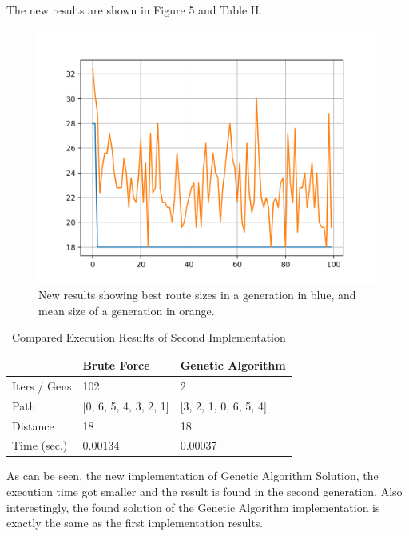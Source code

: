 \documentclass[journal,transmag]{IEEEtran}
\begin{document}
    The new results are shown in Figure 5 and Table II.

    \begin{figure}[H]
        \includegraphics[width=\linewidth]{new-results.png}
        \caption{
            New results showing best route sizes in a generation in blue, and
            mean size of a generation in orange.
        }
        \label{fig:new-results}
    \end{figure}

    \begin{table}[H]
        \begin{center}
            \begin{tabular}{| l | l | l |}
            \hline
            & Brute Force & Genetic Algorithm \\ \hline
            Iters / Gens & 102 & 2 \\ \hline
            Path & [0, 6, 5, 4, 3, 2, 1] & [3, 2, 1, 0, 6, 5, 4] \\ \hline
            Distance & 18 & 18 \\ \hline
            Time (sec.) & 0.00134 & 0.00037 \\
            \hline
            \end{tabular}
        \end{center}
        \caption{Compared Execution Results of Second Implementation}
    \end{table}

    As can be seen, the new implementation of Genetic Algorithm Solution, the
    execution time got smaller and the result is found in the second generation.
    Also interestingly, the found solution of the Genetic Algorithm
    implementation is exactly the same as the first implementation results.
\end{document}
